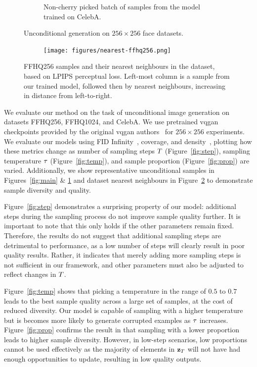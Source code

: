 \begin{figure}
\begin{subfigure}[b]{0.47\textwidth}
        \caption{
            Non-cherry picked batch of samples from the model trained on CelebA.
        }
    \end{subfigure}
    \caption{Unconditional generation on $256 \times 256$ face datasets.}
    \label{fig:face}
\end{figure}

\begin{figure}[ht]
    \centering
    \begin{subfigure}[b]{\textwidth}
        \centering
        \texttt{[image: figures/nearest-ffhq256.png]}
    \end{subfigure}
    \caption{
        FFHQ256 samples and their nearest neighbours in the dataset, based on LPIPS
        perceptual loss. Left-most column is a sample from our trained
        model, followed then by nearest neighbours, increasing in distance
        from left-to-right.
    }
    \label{fig:nearest}
\end{figure}

We evaluate our method on the task of unconditional image generation on datasets
FFHQ256, FFHQ1024, and CelebA. We use pretrained \gls{vqgan} checkpoints
provided by the original \gls{vqgan} authors~\cite{esser2021taming} for $256
\times 256$ experiments. We evaluate our models using FID
Infinity~\cite{chong2020effectively}, coverage, and
density~\cite{ferjad2020icml}, plotting how these metrics change as number of
sampling steps $T$ (Figure~\ref{fig:step}), sampling temperature
$\tau$ (Figure~\ref{fig:temp}), and sample proportion
(Figure~\ref{fig:prop}) are varied. Additionally, we show representative
unconditional samples in Figures~\ref{fig:main} \& \ref{fig:face} and dataset
nearest neighbours in Figure~\ref{fig:nearest} to demonstrate sample diversity
and quality.

Figure~\ref{fig:step} demonstrates a surprising property of our model:
additional steps during the sampling process do not improve sample quality
further. It is important to note that this only holds if the other parameters
remain fixed. Therefore, the results do not suggest that additional sampling
steps are detrimental to performance, as a low number of steps will
clearly result in poor quality results. Rather, it indicates that merely
adding more sampling steps is not sufficient in our framework, and other
parameters must also be adjusted to reflect changes in $T$.

Figure~\ref{fig:temp} shows that picking a temperature in the range of $0.5$ to
$0.7$ leads to the best sample quality across a large set of samples, at the
cost of reduced diversity. Our model is capable of sampling with a higher
temperature but is becomes more likely to generate corrupted examples as
$\tau$ increases. Figure~\ref{fig:prop} confirms the result in
\citet{savinov2022stepunrolled} that sampling with a lower proportion leads to
higher sample diversity. However, in low-step scenarios, low proportions cannot
be used effectively as the majority of elements in $\mathbf{z}_T$ will
not have had enough opportunities to update, resulting in low quality outputs.

